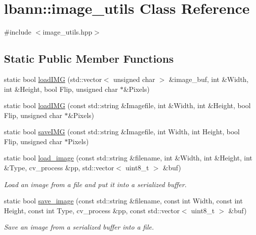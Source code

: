 \hypertarget{classlbann_1_1image__utils}{}\section{lbann\+:\+:image\+\_\+utils Class Reference}
\label{classlbann_1_1image__utils}


{\ttfamily \#include $<$image\+\_\+utils.\+hpp$>$}

\subsection*{Static Public Member Functions}
\begin{DoxyCompactItemize}
\item 
static bool \hyperlink{classlbann_1_1image__utils_a6043097a96cf246ac1b63053ed15962b}{load\+I\+MG} (std\+::vector$<$ unsigned char $>$ \&image\+\_\+buf, int \&Width, int \&Height, bool Flip, unsigned char $\ast$\&Pixels)
\item 
static bool \hyperlink{classlbann_1_1image__utils_a0ed89f3bc964aec90799ace32bf788e4}{load\+I\+MG} (const std\+::string \&Imagefile, int \&Width, int \&Height, bool Flip, unsigned char $\ast$\&Pixels)
\item 
static bool \hyperlink{classlbann_1_1image__utils_a215ea7f6ac4ddb38f7e2b5c7b5ea1420}{save\+I\+MG} (const std\+::string \&Imagefile, int Width, int Height, bool Flip, unsigned char $\ast$Pixels)
\item 
static bool \hyperlink{classlbann_1_1image__utils_ac324a04f877601387cfb10750f1f6b8d}{load\+\_\+image} (const std\+::string \&filename, int \&Width, int \&Height, int \&Type, cv\+\_\+process \&pp, std\+::vector$<$ uint8\+\_\+t $>$ \&buf)
\begin{DoxyCompactList}\small\item\em Load an image from a file and put it into a serialized buffer. \end{DoxyCompactList}\item 
static bool \hyperlink{classlbann_1_1image__utils_a203c94bf2f0d1180af1be27da33a0ad6}{save\+\_\+image} (const std\+::string \&filename, const int Width, const int Height, const int Type, cv\+\_\+process \&pp, const std\+::vector$<$ uint8\+\_\+t $>$ \&buf)
\begin{DoxyCompactList}\small\item\em Save an image from a serialized buffer into a file. \end{DoxyCompactList}\item 

\end{DoxyCompactItemize}
